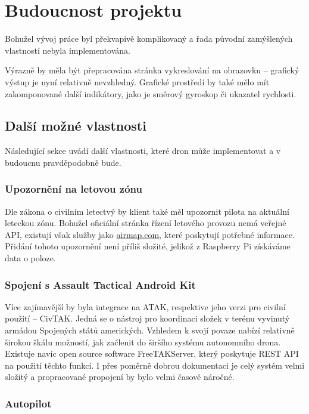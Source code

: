 \documentclass[a4paper,oneside,12pt]{report}
\begin{document}
\chapter{Budoucnost projektu}

Bohužel vývoj práce byl překvapivě komplikovaný a řada původní zamýšlených vlastností nebyla implementována.

Výrazně by měla být přepracována stránka vykreslování na obrazovku -- grafický výstup je nyní relativně nevzhledný.
Grafické prostředí by také mělo mít zakomponované další indikátory, jako je směrový gyroskop či ukazatel rychlosti.

\section{Další možné vlastnosti}

Následující sekce uvádí další vlastnosti, které dron může implementovat a v budoucnu pravděpodobně bude.

\subsection{Upozornění na letovou zónu}
Dle zákona o civilním letectvý by klient také měl upozornit pilota na aktuální leteckou zónu.
Bohužel oficiální stránka řízení letového provozu nemá veřejné API, existují však služby jako \url{airmap.com}, které poskytují potřebné informace.
Přidání tohoto upozornění není příliš složité, jelikož z Raspberry Pi získáváme data o poloze.

\subsection{Spojení s Assault Tactical Android Kit}

Více zajímavější by byla integrace na ATAK, respektive jeho verzi pro civilní použití -- CivTAK.
Jedná se o nástroj pro koordinaci složek v terénu vyvinutý armádou Spojených států amerických.
Vzhledem k svojí povaze nabízí relativně širokou škálu možností, jak začlenit do širšího systému autonomního drona.
Existuje navíc open source software FreeTAKServer, který poskytuje REST API na použití těchto funkcí.
I přes poměrně dobrou dokumentaci je celý systém velmi složitý a propracované propojení by bylo velmi časově náročné.

\subsection{Autopilot}
\end{document}

